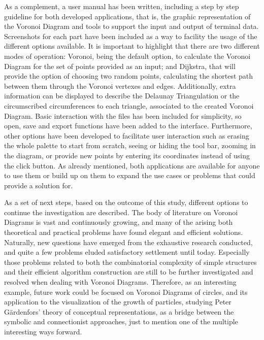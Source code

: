 As a complement, a user manual has been written, including a step by step guideline for both developed applications, that is, the graphic representation of the Voronoi Diagram and tools to support the input and output of terminal data. Screenshots for each part have been included as a way to facility the usage of the different options available. It is important to highlight that there are two different modes of operation: Voronoi, being the default option, to calculate the Voronoi Diagram for the set of points provided as an input; and Dijkstra, that will provide the option of choosing two random points, calculating the shortest path between them through the Voronoi vertexes and edges. Additionally, extra information can be displayed to describe the Delaunay Triangulation or the circumscribed circumferences to each triangle, associated to the created Voronoi Diagram. Basic interaction with the files has been included for simplicity, so open, save and export functions have been added to the interface. Furthermore, other options have been developed to facilitate user interaction such as erasing the whole palette to start from scratch, seeing or hiding the tool bar, zooming in the diagram, or provide new points by entering its coordinates instead of using the click button. As already mentioned, both applications are available for anyone to use them or build up on them to expand the use cases or problems that could provide a solution for.

As a set of next steps, based on the outcome of this study, different options to continue the investigation are described. The body of literature on Voronoi Diagrams is vast and continuously growing, and many of the arising both theoretical and practical problems have found elegant and efficient solutions. Naturally, new questions have emerged from the exhaustive research conducted, and quite a few problems eluded satisfactory settlement until today. Especially those problems related to both the combinatorial complexity of simple structures and their efficient algorithm construction are still to be further investigated and resolved when dealing with Voronoi Diagrams. Therefore, as an interesting example, future work could be focused on Voronoi Diagrams of circles, and its application to the visualization of the growth of particles, studying Peter Gärdenfors’ theory of conceptual representations, as a bridge between the symbolic and connectionist approaches, just to mention one of the multiple interesting ways forward.



